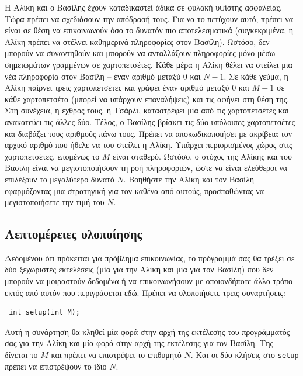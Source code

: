 \documentclass[12pt]{article}
\begin{document}
\renewcommand{\round}{Ημέρα 1}
\renewcommand{\problemName}{Φυλακή}
\renewcommand{\lang}{Ελληνικά}

\renewcommand{\tl}{$2$ δευτ.}
\renewcommand{\ml}{$1024$ MB}
\problem{\problemName}

Η Αλίκη και ο Βασίλης έχουν καταδικαστεί άδικα σε φυλακή υψίστης ασφαλείας. Τώρα πρέπει να σχεδιάσουν την απόδρασή τους. Για να το πετύχουν αυτό, πρέπει να είναι σε θέση να επικοινωνούν όσο το δυνατόν πιο αποτελεσματικά (συγκεκριμένα, η Αλίκη πρέπει να στέλνει καθημερινά πληροφορίες στον Βασίλη). Ωστόσο, δεν μπορούν να συναντηθούν και μπορούν να ανταλλάξουν πληροφορίες μόνο μέσω σημειωμάτων γραμμένων σε χαρτοπετσέτες. Κάθε μέρα η Αλίκη θέλει να στείλει μια νέα πληροφορία στον Βασίλη -- έναν αριθμό μεταξύ $0$ και $N-1$. Σε κάθε γεύμα, η Αλίκη παίρνει τρεις χαρτοπετσέτες και γράφει έναν αριθμό μεταξύ $0$ και $M-1$ σε κάθε χαρτοπετσέτα (μπορεί να υπάρχουν επαναλήψεις) και τις αφήνει στη θέση της. Στη συνέχεια, η εχθρός τους, η Τσάρλι, καταστρέφει μία από τις χαρτοπετσέτες και ανακατεύει τις άλλες δύο. Τέλος, ο Βασίλης βρίσκει τις δύο υπόλοιπες χαρτοπετσέτες και διαβάζει τους αριθμούς πάνω τους. Πρέπει να αποκωδικοποιήσει με ακρίβεια τον αρχικό αριθμό που ήθελε να του στείλει η Αλίκη. Υπάρχει περιορισμένος χώρος στις χαρτοπετσέτες, επομένως το $M$ είναι σταθερό. Ωστόσο, ο στόχος της Αλίκης και του Βασίλη είναι να μεγιστοποιήσουν τη ροή πληροφοριών, ώστε να είναι ελεύθεροι να επιλέξουν το μεγαλύτερο δυνατό $N$. Βοηθήστε την Αλίκη και τον Βασίλη εφαρμόζοντας μια στρατηγική για τον καθένα από αυτούς, προσπαθώντας να μεγιστοποιήσετε την τιμή του $N$.

\subsection{Λεπτομέρειες υλοποίησης}
Δεδομένου ότι πρόκειται για πρόβλημα επικοινωνίας, το πρόγραμμά σας θα τρέξει σε δύο ξεχωριστές εκτελέσεις (μία για την Αλίκη και μία για τον Βασίλη) που δεν μπορούν να μοιραστούν δεδομένα ή να επικοινωνήσουν με οποιονδήποτε άλλο τρόπο εκτός από αυτόν που περιγράφεται εδώ. Πρέπει να υλοποιήσετε τρεις συναρτήσεις:

\begin{lstlisting}
 int setup(int M);
\end{lstlisting}

Αυτή η συνάρτηση θα κληθεί μία φορά στην αρχή της εκτέλεσης του προγράμματός σας για την Αλίκη και μία φορά στην αρχή της εκτέλεσης για τον Βασίλη. Της δίνεται το $M$ και πρέπει να επιστρέψει το επιθυμητό $N$. Και οι δύο κλήσεις στο \texttt{setup} πρέπει να επιστρέψουν το ίδιο $N$.
\end{document}
